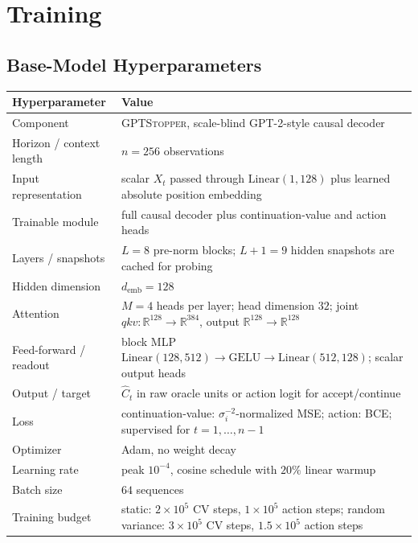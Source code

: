 \documentclass[11pt]{article}
\begin{document}
\section{Training}
\label{app:training}

\subsection{Base-Model Hyperparameters}

\begin{table}[H]
\centering
\small
\renewcommand{\arraystretch}{1.18}
\begin{tabular}{p{} p{}}
\hline
Hyperparameter & Value \\
\hline
Component & \textsc{GPTStopper}, scale-blind GPT-2-style causal decoder \\
Horizon / context length & \(n=256\) observations \\
Input representation & scalar \(X_t\) passed through \(\mathrm{Linear}(1,128)\) plus learned absolute position embedding \\
Trainable module & full causal decoder plus continuation-value and action heads \\
Layers / snapshots & \(L=8\) pre-norm blocks; \(L+1=9\) hidden snapshots are cached for probing \\
Hidden dimension & \(d_{\mathrm{emb}}=128\) \\
Attention & \(M=4\) heads per layer; head dimension \(32\); joint \(qkv:\mathbb{R}^{128}\to\mathbb{R}^{384}\), output \(\mathbb{R}^{128}\to\mathbb{R}^{128}\) \\
Feed-forward / readout & block MLP \(\mathrm{Linear}(128,512)\to\mathrm{GELU}\to\mathrm{Linear}(512,128)\); scalar output heads \\
Output / target & \(\widehat C_t\) in raw oracle units or action logit for accept/continue \\
Loss & continuation-value: \(\sigma_i^{-2}\)-normalized MSE; action: BCE; supervised for \(t=1,\ldots,n-1\) \\
Optimizer & Adam, no weight decay \\
Learning rate & peak \(10^{-4}\), cosine schedule with \(20\%\) linear warmup \\
Batch size & \(64\) sequences \\
Training budget & static: \(2\times10^5\) CV steps, \(1\times10^5\) action steps; random variance: \(3\times10^5\) CV steps, \(1.5\times10^5\) action steps \\

\end{tabular}
\end{table}
\end{document}
